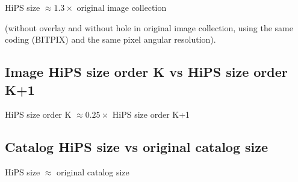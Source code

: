 \documentclass[11pt,a4paper]{ivoa}
\begin{document}
HiPS size $\approx 1.3 \times$ original image collection

(without overlay and without hole in original image collection, using the same coding (BITPIX) and the same pixel angular resolution).

\subsection{Image HiPS size order K vs HiPS size order K+1}

HiPS size order K $\approx 0.25 \times$ HiPS size order K+1

\subsection{Catalog HiPS size vs original catalog size}

HiPS size $\approx$ original catalog size
\end{document}
